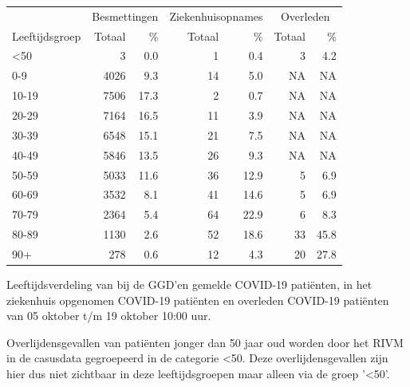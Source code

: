 \documentclass[
  english,
  man,floatsintext]{apa6}
\begin{document}
\begin{table}
\centering\begingroup\fontsize{11}{13}\selectfont

\begin{threeparttable}
\begin{tabular}{lrrrrrr}
\toprule
\multicolumn{1}{c}{ } & \multicolumn{2}{c}{Besmettingen} & \multicolumn{2}{c}{Ziekenhuisopnames} & \multicolumn{2}{c}{Overleden} \\
\cmidrule(l{3pt}r{3pt}){2-3} \cmidrule(l{3pt}r{3pt}){4-5} \cmidrule(l{3pt}r{3pt}){6-7}
Leeftijdsgroep & Totaal & \% & Totaal & \% & Totaal & \%\\
\midrule
<50 & 3 & 0.0 & 1 & 0.4 & 3 & 4.2\\
0-9 & 4026 & 9.3 & 14 & 5.0 & NA & NA\\
10-19 & 7506 & 17.3 & 2 & 0.7 & NA & NA\\
20-29 & 7164 & 16.5 & 11 & 3.9 & NA & NA\\
30-39 & 6548 & 15.1 & 21 & 7.5 & NA & NA\\
40-49 & 5846 & 13.5 & 26 & 9.3 & NA & NA\\
50-59 & 5033 & 11.6 & 36 & 12.9 & 5 & 6.9\\
60-69 & 3532 & 8.1 & 41 & 14.6 & 5 & 6.9\\
70-79 & 2364 & 5.4 & 64 & 22.9 & 6 & 8.3\\
80-89 & 1130 & 2.6 & 52 & 18.6 & 33 & 45.8\\
90+ & 278 & 0.6 & 12 & 4.3 & 20 & 27.8\\
\bottomrule
\end{tabular}
\begin{tablenotes}
\item[1] Leeftijdsverdeling van bij de GGD’en gemelde COVID-19 patiënten, in het ziekenhuis opgenomen COVID-19 patiënten en overleden COVID-19 patiënten van 05 oktober t/m 19 oktober 10:00 uur.
\item[2] Overlijdensgevallen van patiënten jonger dan 50 jaar oud worden door het RIVM in de casusdata gegroepeerd in de categorie <50. Deze overlijdensgevallen zijn hier dus niet zichtbaar in deze leeftijdsgroepen maar alleen via de groep '<50'.
\end{tablenotes}
\end{threeparttable}
\endgroup{}
\end{table}

\newpage
\end{document}
